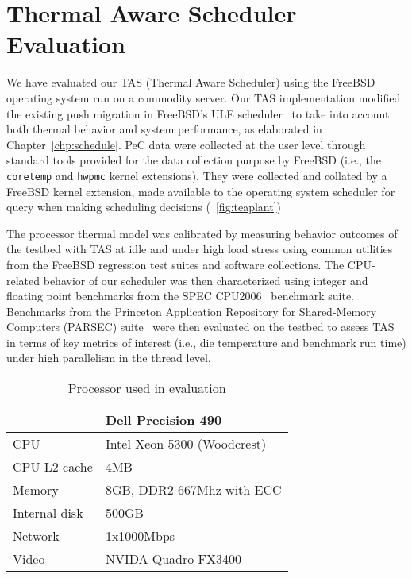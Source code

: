 %
\chapter{Thermal Aware Scheduler Evaluation}
\label{chp:scheduler-evaluation}
We have evaluated our TAS (Thermal Aware Scheduler) using the FreeBSD
operating system run on a commodity server.  Our TAS implementation
modified the existing push migration in FreeBSD's ULE
scheduler~\cite{Roberson2003,McKusick2004,McKusick2004b} to take into
account both thermal behavior and system performance, as elaborated in
Chapter~\ref{chp:schedule}.  PeC data were collected at the user level
through standard tools provided for the data collection purpose by
FreeBSD (i.e., the \texttt{coretemp} and \texttt{hwpmc} kernel
extensions).  They were collected and collated by a FreeBSD kernel
extension, made available to the operating system scheduler for query
when making scheduling decisions (\figurename~\ref{fig:teaplant})

The processor thermal model was calibrated by measuring behavior
outcomes of the testbed with TAS at idle and under high load stress
using common utilities from the FreeBSD regression test suites and
software collections.  The CPU-related behavior of our scheduler was
then characterized using integer and floating point benchmarks from the
SPEC CPU2006~\cite{Henning2006} benchmark suite.  Benchmarks from the
Princeton Application Repository for Shared-Memory Computers (PARSEC)
suite~\cite{Bienia2008} were then evaluated on the testbed to assess TAS
in terms of key metrics of interest (i.e., die temperature and benchmark
run time) under high parallelism in the thread level.

\begin{table}[tbhp] 
\centering
  \caption{Processor used in evaluation}
  \label{tab:hardware}
  \begin{tabular}{l l} 
\hline 
\hline
&\textbf{Dell Precision 490}\\ 
\hline 
CPU&Intel Xeon 5300 (Woodcrest)\\ 
CPU L2 cache&4MB\\ 
Memory&8GB, DDR2 667Mhz with ECC\\
Internal disk&500GB\\ 
Network&1x1000Mbps\\ 
Video&NVIDA Quadro FX3400\\ 
\hline
  \end{tabular}
\end{table}
